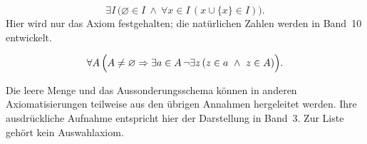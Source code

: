 \begin{axiom}[Unendlichkeit]
\[
 \exists I\,\bigl(\varnothing\in I\ \land\
             \forall x\in I\,(x\cup\{x\}\in I)\bigr).
\]
Hier wird nur das Axiom festgehalten; die natürlichen Zahlen werden
in Band~10 entwickelt.
\end{axiom}

\begin{axiom}
\[
 \forall A\,\Bigl(A\ne\varnothing\Rightarrow
  \exists a\in A\,\neg\exists z\,(z\in a\ \land\ z\in A)\Bigr).
\]
\end{axiom}

Die leere Menge und das Aussonderungsschema können in anderen
Axiomatisierungen teilweise aus den übrigen Annahmen hergeleitet
werden. Ihre ausdrückliche Aufnahme entspricht hier der Darstellung
in Band~3. Zur Liste gehört kein Auswahlaxiom.
